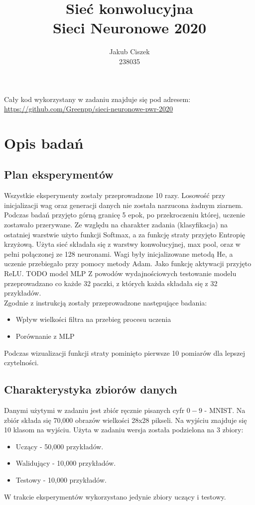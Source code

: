 \documentclass{article}
\title{  Sieć konwolucyjna\\Sieci Neuronowe 2020 }
\author{
  Jakub Ciszek \\
  238035\\
}
\begin{document}
\maketitle

\newpage
\tableofcontents
\newpage

Cały kod wykorzystany w zadaniu znajduje się pod adresem: \url{https://github.com/Greenpp/sieci-neuronowe-pwr-2020}

\section{Opis badań}
\subsection{Plan eksperymentów}

Wszystkie eksperymenty zostały przeprowadzone 10 razy. Losowość przy inicjalizacji wag oraz generacji danych nie została narzucona żadnym ziarnem. Podczas badań przyjęto górną granicę 5 epok, po przekroczeniu której, uczenie zostawało przerywane. Ze względu na charakter zadania (klasyfikacja) na ostatniej warstwie użyto funkcji Softmax, a za funkcję straty przyjęto Entropię krzyżową. Użyta sieć składała się z warstwy konwolucyjnej, max pool, oraz w pełni połączonej ze 128 neuronami. Wagi były inicjalizowane metodą He, a uczenie przebiegało przy pomocy metody Adam. Jako funkcję aktywacji przyjęto ReLU.
TODO model MLP
Z powodów wydajnościowych testowanie modelu przeprowadzano co każde 32 paczki, z których każda składała się z 32 przykładów.\\
Zgodnie z instrukcją zostały przeprowadzone następujące badania:
\begin{itemize}
	\item Wpływ wielkości filtra na przebieg procesu uczenia
	\item Porównanie z MLP    
\end{itemize}
Podczas wizualizacji funkcji straty pominięto pierwsze 10 pomiarów dla lepszej czytelności.

\subsection{Charakterystyka zbiorów danych}

Danymi użytymi w zadaniu jest zbiór ręcznie pisanych cyfr \(0-9\) - MNIST. Na zbiór składa się 70,000 obrazów wielkości 28x28 pikseli. Na wyjściu znajduje się 10 klasom na wyjściu. Użyta w zadaniu wersja została podzielona na 3 zbiory:
\begin{itemize}
	\item Uczący - 50,000 przykładów.
	\item Walidujący - 10,000 przykładów.
	\item Testowy - 10,000 przykładów.
\end{itemize}
W trakcie eksperymentów wykorzystano jedynie zbiory uczący i testowy.
\end{document}
